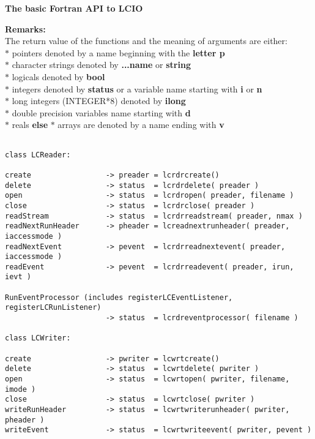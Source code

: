 
{\large\bf The basic Fortran API to LCIO} \\

\begin{scriptsize}

{\bf Remarks:} \\

The return value of the functions and the meaning of arguments are either: \\
$*$ pointers denoted by a name beginning with the {\bf letter p} \\
$*$ character strings denoted by {\bf ...name} or {\bf string} \\
$*$ logicals  denoted by {\bf bool} \\
$*$ integers  denoted by {\bf status} or a variable name starting with {\bf i} or {\bf n}\\
$*$ long integers (INTEGER*8) denoted by {\bf ilong}\\
$*$ double precision variables name starting with {\bf d} \\
$*$ reals {\bf else}
$*$ arrays are denoted by a name ending with {\bf v} \\


\begin{verbatim}

class LCReader:

create                 -> preader = lcrdrcreate()
delete                 -> status  = lcrdrdelete( preader )
open                   -> status  = lcrdropen( preader, filename )
close                  -> status  = lcrdrclose( preader )
readStream             -> status  = lcrdrreadstream( preader, nmax )
readNextRunHeader      -> pheader = lcreadnextrunheader( preader, iaccessmode )
readNextEvent          -> pevent  = lcrdrreadnextevent( preader, iaccessmode )
readEvent              -> pevent  = lcrdrreadevent( preader, irun, ievt )

RunEventProcessor (includes registerLCEventListener, registerLCRunListener)
                       -> status  = lcrdreventprocessor( filename )

class LCWriter:

create                 -> pwriter = lcwrtcreate()
delete                 -> status  = lcwrtdelete( pwriter )
open                   -> status  = lcwrtopen( pwriter, filename, imode )
close                  -> status  = lcwrtclose( pwriter )
writeRunHeader         -> status  = lcwrtwriterunheader( pwriter, pheader )
writeEvent             -> status  = lcwrtwriteevent( pwriter, pevent )



\end{verbatim}
\end{scriptsize}
